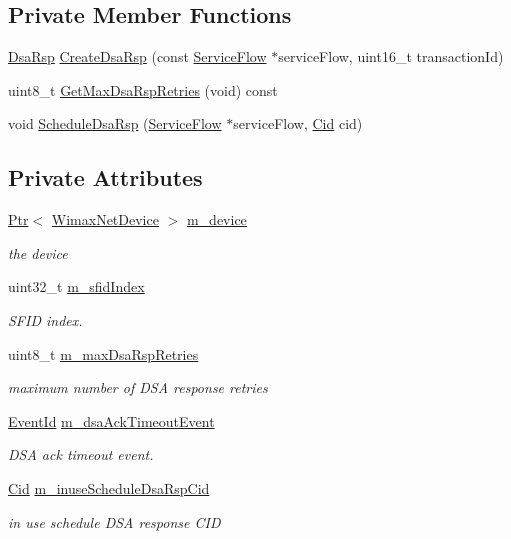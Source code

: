 \subsection*{Private Member Functions}
\begin{DoxyCompactItemize}
\item 
\hyperlink{classns3_1_1DsaRsp}{Dsa\+Rsp} \hyperlink{classns3_1_1BsServiceFlowManager_ac67cef767e9e9c07403b9b0ed795619b}{Create\+Dsa\+Rsp} (const \hyperlink{classns3_1_1ServiceFlow}{Service\+Flow} $\ast$service\+Flow, uint16\+\_\+t transaction\+Id)
\item 
uint8\+\_\+t \hyperlink{classns3_1_1BsServiceFlowManager_a927caa1f79f0f770bc15cb62ad2e8495}{Get\+Max\+Dsa\+Rsp\+Retries} (void) const 
\item 
void \hyperlink{classns3_1_1BsServiceFlowManager_a70acd126e153faa38588075406ec1d5b}{Schedule\+Dsa\+Rsp} (\hyperlink{classns3_1_1ServiceFlow}{Service\+Flow} $\ast$service\+Flow, \hyperlink{classns3_1_1Cid}{Cid} cid)
\end{DoxyCompactItemize}
\subsection*{Private Attributes}
\begin{DoxyCompactItemize}
\item 
\hyperlink{classns3_1_1Ptr}{Ptr}$<$ \hyperlink{classns3_1_1WimaxNetDevice}{Wimax\+Net\+Device} $>$ \hyperlink{classns3_1_1BsServiceFlowManager_a6fa275f84e4458c687787b1974a00382}{m\+\_\+device}
\begin{DoxyCompactList}\small\item\em the device \end{DoxyCompactList}\item 
uint32\+\_\+t \hyperlink{classns3_1_1BsServiceFlowManager_af08f7e386d477d94d6ed94f39c692c4f}{m\+\_\+sfid\+Index}
\begin{DoxyCompactList}\small\item\em S\+F\+ID index. \end{DoxyCompactList}\item 
uint8\+\_\+t \hyperlink{classns3_1_1BsServiceFlowManager_a187563222d3a6b050019ba4e71f916d8}{m\+\_\+max\+Dsa\+Rsp\+Retries}
\begin{DoxyCompactList}\small\item\em maximum number of D\+SA response retries \end{DoxyCompactList}\item 
\hyperlink{classns3_1_1EventId}{Event\+Id} \hyperlink{classns3_1_1BsServiceFlowManager_adc5e10a0a7b826157a09da28fb4f3c0f}{m\+\_\+dsa\+Ack\+Timeout\+Event}
\begin{DoxyCompactList}\small\item\em D\+SA ack timeout event. \end{DoxyCompactList}\item 
\hyperlink{classns3_1_1Cid}{Cid} \hyperlink{classns3_1_1BsServiceFlowManager_a5bb3b84ebe38fc20af15f618add2227a}{m\+\_\+inuse\+Schedule\+Dsa\+Rsp\+Cid}
\begin{DoxyCompactList}\small\item\em in use schedule D\+SA response C\+ID \end{DoxyCompactList}\end{DoxyCompactItemize}
